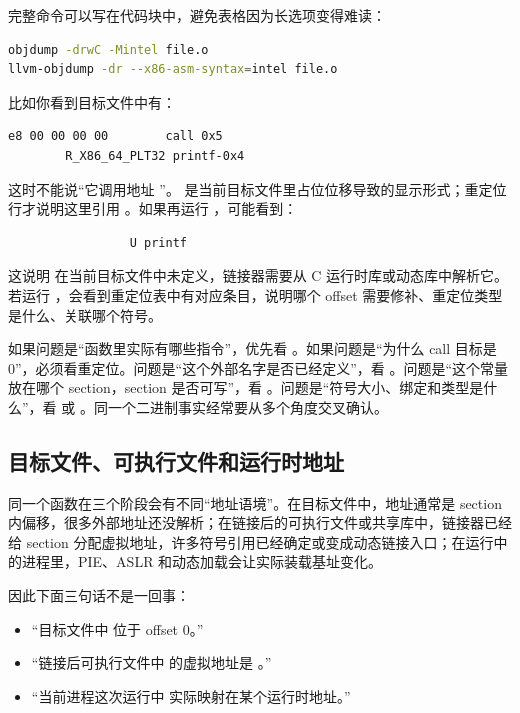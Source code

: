 完整命令可以写在代码块中，避免表格因为长选项变得难读：

\begin{lstlisting}[language=bash]
objdump -drwC -Mintel file.o
llvm-objdump -dr --x86-asm-syntax=intel file.o
\end{lstlisting}

比如你看到目标文件中有：

\begin{lstlisting}
e8 00 00 00 00        call 0x5
        R_X86_64_PLT32 printf-0x4
\end{lstlisting}

这时不能说“它调用地址 ”。 是当前目标文件里占位位移导致的显示形式；重定位行才说明这里引用 。如果再运行 ，可能看到：

\begin{lstlisting}
                 U printf
\end{lstlisting}

这说明  在当前目标文件中未定义，链接器需要从 C 运行时库或动态库中解析它。若运行 ，会看到重定位表中有对应条目，说明哪个 offset 需要修补、重定位类型是什么、关联哪个符号。

如果问题是“函数里实际有哪些指令”，优先看 。如果问题是“为什么 call 目标是 0”，必须看重定位。问题是“这个外部名字是否已经定义”，看 。问题是“这个常量放在哪个 section，section 是否可写”，看 。问题是“符号大小、绑定和类型是什么”，看  或 。同一个二进制事实经常要从多个角度交叉确认。

\subsection{目标文件、可执行文件和运行时地址}

同一个函数在三个阶段会有不同“地址语境”。在目标文件中，地址通常是 section 内偏移，很多外部地址还没解析；在链接后的可执行文件或共享库中，链接器已经给 section 分配虚拟地址，许多符号引用已经确定或变成动态链接入口；在运行中的进程里，PIE、ASLR 和动态加载会让实际装载基址变化。

因此下面三句话不是一回事：

\begin{itemize}
  \item “目标文件中  位于  offset 0。”
  \item “链接后可执行文件中  的虚拟地址是 。”
  \item “当前进程这次运行中  实际映射在某个运行时地址。”
\end{itemize}

